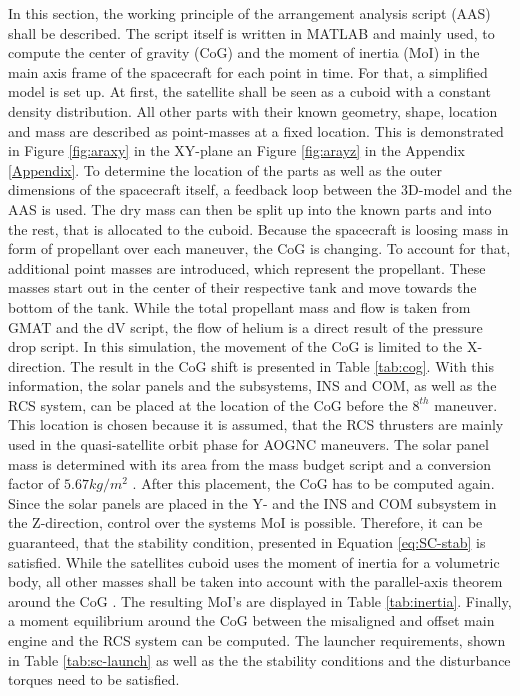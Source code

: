 In this section, the working principle of the arrangement analysis script (AAS) shall be described. The script itself is written in MATLAB and mainly used, to compute the center of gravity (CoG) and the moment of inertia (MoI) in the main axis frame of the spacecraft for each point in time. For that, a simplified model is set up. At first, the satellite shall be seen as a cuboid with a constant density distribution. All other parts with their known geometry, shape, location and mass are described as point-masses at a fixed location. This is demonstrated in Figure \ref{fig:araxy} in the XY-plane an Figure \ref{fig:arayz} in the Appendix \ref{Appendix}. To determine the location of the parts as well as the outer dimensions of the spacecraft itself, a feedback loop between the 3D-model and the AAS is used. The dry mass can then be split up into the known parts and into the rest, that is allocated to the cuboid. Because the spacecraft is loosing mass in form of propellant over each maneuver, the CoG is changing. To account for that, additional point masses are introduced, which represent the propellant. These masses start out in the center of their respective tank and move towards the bottom of the tank. While the total propellant mass and flow is taken from GMAT and the dV script, the flow of helium is a direct result of the pressure drop script. In this simulation, the movement of the CoG is limited to the X-direction. The result in the CoG shift is presented in Table \ref{tab:cog}. With this information, the solar panels and the subsystems, INS and COM, as well as the RCS system, can be placed at the location of the CoG before the $8^{th}$ maneuver. This location is chosen because it is assumed, that the RCS thrusters are mainly used in the quasi-satellite orbit phase for AOGNC maneuvers. The solar panel mass is determined with its area from the mass budget script and a conversion factor of $5.67 {kg}/{m^{2}}$ \cite{JPL.2015}. After this placement, the CoG has to be computed again. Since the solar panels are placed in the Y- and the INS and COM subsystem in the Z-direction, control over the systems MoI is possible. Therefore, it can be guaranteed, that the stability condition, presented in Equation \ref{eq:SC-stab} is satisfied. While the satellites cuboid uses the moment of inertia for a volumetric body, all other masses shall be taken into account with the parallel-axis theorem around the CoG \cite{Gross.2018}. The resulting MoI's are displayed in Table \ref{tab:inertia}. Finally, a moment equilibrium around the CoG between the misaligned and offset main engine and the RCS system can be computed. The launcher requirements, shown in Table \ref{tab:sc-launch} as well as the the stability conditions and the disturbance torques need to be satisfied.
